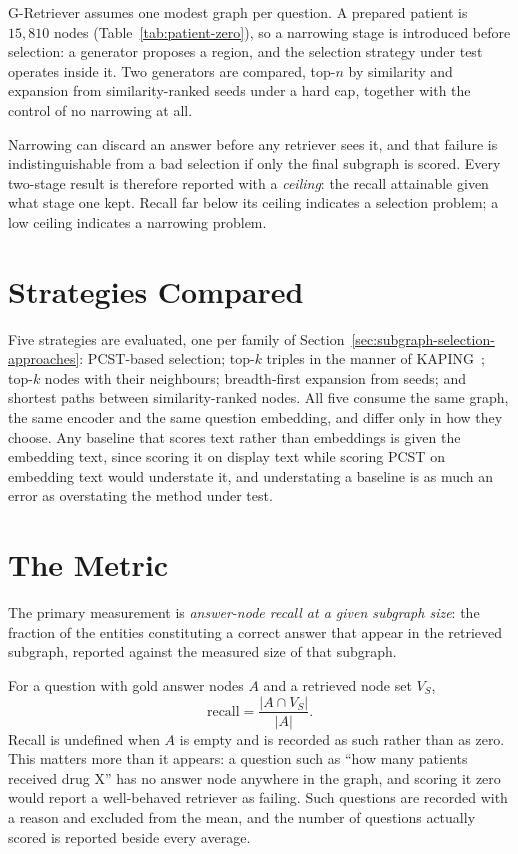 G-Retriever assumes one modest graph per question. A prepared patient is
$15{,}810$ nodes (Table~\ref{tab:patient-zero}), so a narrowing stage is
introduced before selection: a generator proposes a region, and the selection
strategy under test operates inside it. Two generators are compared, top-$n$ by
similarity and expansion from similarity-ranked seeds under a hard cap, together
with the control of no narrowing at all.

Narrowing can discard an answer before any retriever sees it, and that failure is
indistinguishable from a bad selection if only the final subgraph is scored. Every
two-stage result is therefore reported with a \emph{ceiling}: the recall
attainable given what stage one kept. Recall far below its ceiling indicates a
selection problem; a low ceiling indicates a narrowing problem.

\section{Strategies Compared} \label{sec:methodology-strategies}

Five strategies are evaluated, one per family of
Section~\ref{sec:subgraph-selection-approaches}: PCST-based selection; top-$k$
triples in the manner of KAPING~\cite{baek2023kaping}; top-$k$ nodes with their
neighbours; breadth-first expansion from seeds; and shortest paths between
similarity-ranked nodes. All five consume the same graph, the same encoder and
the same question embedding, and differ only in how they choose. Any baseline
that scores text rather than embeddings is given the embedding text, since
scoring it on display text while scoring PCST on embedding text would understate
it, and understating a baseline is as much an error as overstating the method
under test.

\section{The Metric} \label{sec:methodology-metric}

The primary measurement is \emph{answer-node recall at a given subgraph size}:
the fraction of the entities constituting a correct answer that appear in the
retrieved subgraph, reported against the measured size of that subgraph.

For a question with gold answer nodes $A$ and a retrieved node set $V_S$,
%
\begin{equation}
\mathrm{recall} = \frac{\lvert A \cap V_S \rvert}{\lvert A \rvert} .
\label{eq:recall}
\end{equation}
%
Recall is undefined when $A$ is empty and is recorded as such rather than as
zero. This matters more than it appears: a question such as ``how many patients
received drug X'' has no answer node anywhere in the graph, and scoring it zero
would report a well-behaved retriever as failing. Such questions are recorded
with a reason and excluded from the mean, and the number of questions actually
scored is reported beside every average.

